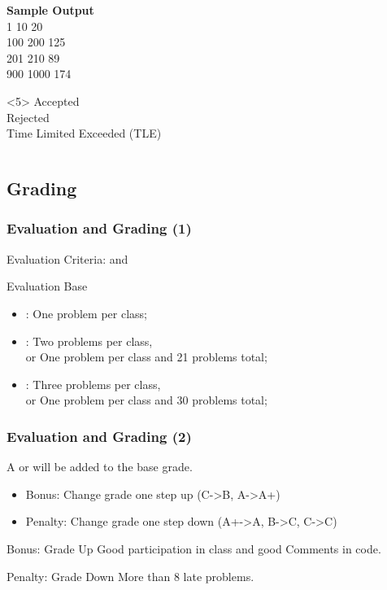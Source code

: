 \documentclass{beamer}
\begin{document}
\begin{frame}
\begin{columns}[c]
\begin{block}{}
\begin{onlyenv}
{        {\bf Sample Output}\\
        1 10 20\\
        100 200 125\\
        201 210 89\\
        900 1000 174\\}
      \end{onlyenv}
      \begin{onlyenv}<5>
        Accepted\\
        Rejected\\
        Time Limited Exceeded (TLE)\\
      \end{onlyenv}
    \end{block}
  \end{columns}
\end{frame}

\subsection{Grading}

\begin{frame}
  \frametitle{Evaluation and Grading (1)}

  Evaluation Criteria:  and 
  
  \begin{block}{Evaluation Base}
  \begin{itemize}
  \item {}: One problem per class;
  \item {}: Two problems per class,\\
    or One problem per class and 21 problems total;
  \item {}: Three problems per class,\\
    or One problem per class and 30 problems total;
  \end{itemize}
  \end{block}
\end{frame}

\begin{frame}
  \frametitle{Evaluation and Grading (2)}
  
  A  or  will be added to the base grade.
  \begin{itemize}
    \item Bonus: Change grade one step up (C->B, A->A+)
    \item Penalty: Change grade one step down (A+->A, B->C, \alert{C->C})
  \end{itemize}
  
  \medskip
  \begin{exampleblock}{Bonus: Grade Up}
    Good participation in class and good Comments in code.
  \end{exampleblock}
  \begin{alertblock}{Penalty: Grade Down}
    More than \alert{8} late problems.
  \end{alertblock}
\end{frame}
\end{document}
